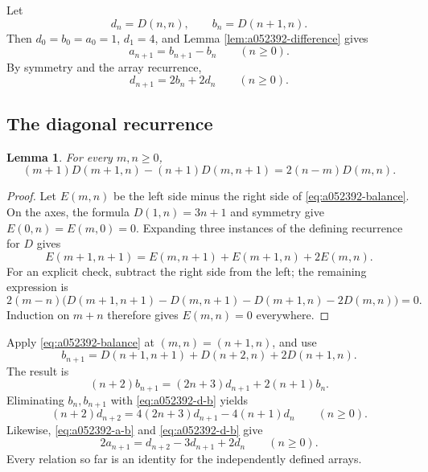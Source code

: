 \documentclass[11pt]{article}
\newtheorem{lemma}[theorem]{Lemma}
\begin{document}
Let
\[
 d_n=D(n,n),\qquad b_n=D(n+1,n).
\]
Then $d_0=b_0=a_0=1$, $d_1=4$, and Lemma
\ref{lem:a052392-difference} gives
\begin{equation}\label{eq:a052392-a-b}
 a_{n+1}=b_{n+1}-b_n\qquad(n\ge0).
\end{equation}
By symmetry and the array recurrence,
\begin{equation}\label{eq:a052392-d-b}
 d_{n+1}=2b_n+2d_n\qquad(n\ge0).
\end{equation}

\subsection{The diagonal recurrence}

\begin{lemma}\label{lem:a052392-balance}
For every $m,n\ge0$,
\begin{equation}\label{eq:a052392-balance}
 (m+1)D(m+1,n)-(n+1)D(m,n+1)=2(n-m)D(m,n).
\end{equation}
\end{lemma}
\begin{proof}
Let $E(m,n)$ be the left side minus the right side of
\eqref{eq:a052392-balance}. On the axes, the formula
$D(1,n)=3n+1$ and symmetry give $E(0,n)=E(m,0)=0$.
Expanding three instances of the defining recurrence for $D$ gives
\[
 E(m+1,n+1)=E(m,n+1)+E(m+1,n)+2E(m,n).
\]
For an explicit check, subtract the right side from the left; the
remaining expression is
\[
 2(m-n)\bigl(D(m+1,n+1)-D(m,n+1)-D(m+1,n)-2D(m,n)\bigr)=0.
\]
Induction on $m+n$ therefore gives $E(m,n)=0$ everywhere.
\end{proof}

Apply \eqref{eq:a052392-balance} at $(m,n)=(n+1,n)$, and use
\[
 b_{n+1}=D(n+1,n+1)+D(n+2,n)+2D(n+1,n).
\]
The result is
\begin{equation}\label{eq:a052392-brec}
 (n+2)b_{n+1}=(2n+3)d_{n+1}+2(n+1)b_n.
\end{equation}
Eliminating $b_n,b_{n+1}$ with \eqref{eq:a052392-d-b} yields
\begin{equation}\label{eq:a052392-drec}
 (n+2)d_{n+2}=4(2n+3)d_{n+1}-4(n+1)d_n\qquad(n\ge0).
\end{equation}
Likewise, \eqref{eq:a052392-a-b} and \eqref{eq:a052392-d-b} give
\begin{equation}\label{eq:a052392-source-central}
 2a_{n+1}=d_{n+2}-3d_{n+1}+2d_n\qquad(n\ge0).
\end{equation}
Every relation so far is an identity for the independently defined arrays.
\end{document}
